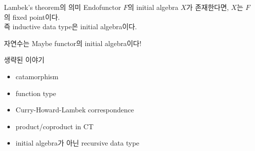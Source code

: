 \documentclass[t]{beamer}
\begin{document}
\begin{frame}{Lambek's theorem의 의미}
  Endofunctor \(F\)의 initial algebra \(X\)가 존재한다면, \(X\)는 \(F\)의 fixed point이다.\\
  즉 inductive data type은 initial algebra이다.\\
  \pause
  \begin{center}
    자연수는 Maybe functor의 initial algebra이다!
  \end{center}
\end{frame}

\begin{frame}{생략된 이야기}
  \begin{itemize}
    \item catamorphism
    \item function type
    \item Curry-Howard-Lambek correspondence
    \item product/coproduct in CT
    \item initial algebra가 아닌 recursive data type
  \end{itemize}
\end{frame}
\end{document}
